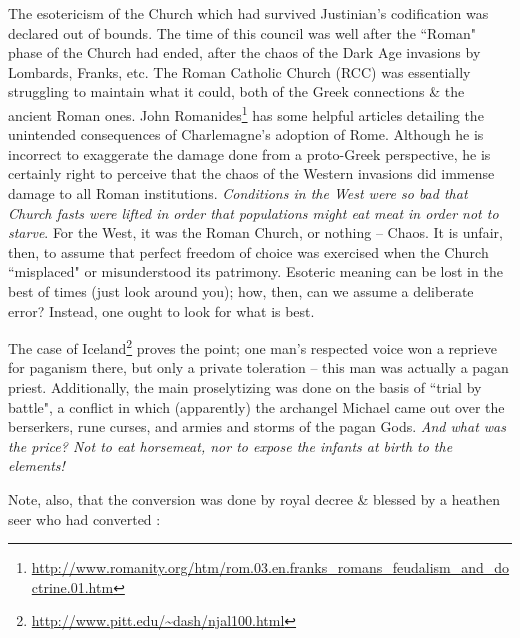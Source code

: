 The esotericism of the Church which had survived Justinian's codification was declared out of bounds. The time of this council was well after the ``Roman" phase of the Church had ended, after the chaos of the Dark Age invasions by Lombards, Franks, etc. The Roman Catholic Church (RCC) was essentially struggling to maintain what it could, both of the Greek connections \& the ancient Roman ones. John Romanides\footnote{\url{http://www.romanity.org/htm/rom.03.en.franks_romans_feudalism_and_doctrine.01.htm}} has some helpful articles detailing the unintended consequences of Charlemagne's adoption of Rome. Although he is incorrect to exaggerate the damage done from a proto-Greek perspective, he is certainly right to perceive that the chaos of the Western invasions did immense damage to all Roman institutions. \emph{Conditions in the West were so bad that Church fasts were lifted in order that populations might eat meat in order not to starve}. For the West, it was the Roman Church, or nothing – Chaos. It is unfair, then, to assume that perfect freedom of choice was exercised when the Church ``misplaced" or misunderstood its patrimony. Esoteric meaning can be lost in the best of times (just look around you); how, then, can we assume a deliberate error? Instead, one ought to look for what is best.

The case of Iceland\footnote{\url{http://www.pitt.edu/\~dash/njal100.html}} proves the point; one man's respected voice won a reprieve for paganism there, but only a private toleration – this man was actually a pagan priest. Additionally, the main proselytizing was done on the basis of ``trial by battle", a conflict in which (apparently) the archangel Michael came out over the berserkers, rune curses, and armies and storms of the pagan Gods.\emph{ And what was the price? Not to eat horsemeat, nor to expose the infants at birth to the elements!}

Note, also, that the conversion was done by royal decree \& blessed by a heathen seer who had converted :

